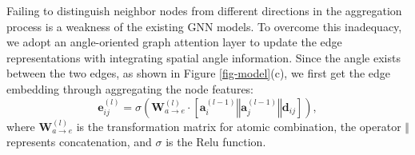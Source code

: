 \documentclass[sigconf]{acmart}
\newcommand{\zhou}[1]{{\color{blue}#1}}
\newcommand{\cat}{\ensuremath{\mathbin\Vert}}
\begin{document}
Failing to distinguish neighbor nodes from different directions in the aggregation process is \hide{\li{an obvious} \zhou{a}}a weakness of the existing GNN models. To overcome this inadequacy, we adopt an angle-oriented graph attention layer to update the edge representations with integrating spatial angle information. Since the angle exists between the two edges, as shown in Figure \ref{fig-model}(c), we first get the edge embedding through aggregating the node features:
\begin{equation}
    \label{eq-a2e}
    \bm{e}_{ij}^{(l)} = \sigma (\bm{W}_{a \rightarrow e}^{(l)} \cdot [\bm{a}_i^{(l-1)} \cat \bm{a}_j^{(l-1)} \cat \bm{d}_{ij}] ),
\end{equation}
where $\bm{W}_{a \rightarrow e}^{(l)}$ is the transformation matrix for atomic combination, the operator $\cat$ represents concatenation, and $\sigma$ is the Relu function.
\end{document}
